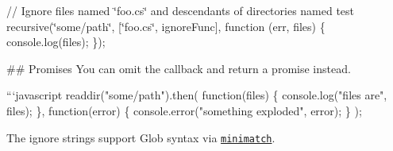 // Ignore files named \char`\"{}foo.\+cs\char`\"{} and descendants of directories named test recursive(\char`\"{}some/path\char`\"{}, \mbox{[}\char`\"{}foo.\+cs\char`\"{}, ignore\+Func\mbox{]}, function (err, files) \{ console.\+log(files); \}); 
\begin{DoxyCode}
## Promises
You can omit the callback and return a promise instead.

```javascript
readdir("some/path").then(
  function(files) \{
    console.log("files are", files);
  \},
  function(error) \{
    console.error("something exploded", error);
  \}
);
\end{DoxyCode}


The ignore strings support Glob syntax via \href{https://github.com/isaacs/minimatch}{\tt minimatch}. 